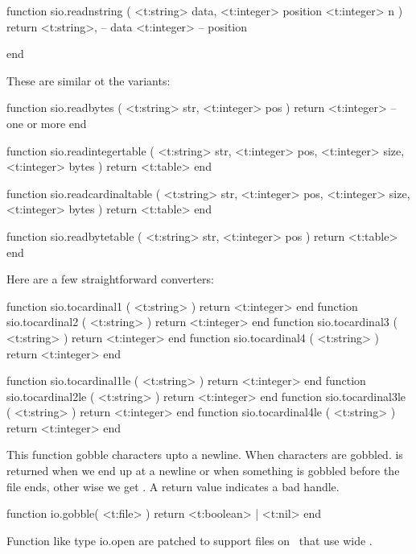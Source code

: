 function sio.readnstring (
    <t:string>  data,
    <t:integer> position
    <t:integer> n
)
    return
        <t:string>,  -- data
        <t:integer>  -- position

end
\stoptyping

These are similar ot the  variants:

\starttyping[option=LUA]
function sio.readbytes (
    <t:string>  str,
    <t:integer> pos
)
    return <t:integer> -- one or more
end

function sio.readintegertable (
    <t:string>  str,
    <t:integer> pos,
    <t:integer> size,
    <t:integer> bytes
)
    return <t:table>
end

function sio.readcardinaltable (
    <t:string>  str,
    <t:integer> pos,
    <t:integer> size,
    <t:integer> bytes
)
    return <t:table>
end

function sio.readbytetable (
    <t:string>  str,
    <t:integer> pos
)
    return <t:table>
end
\stoptyping

Here are a few straightforward converters:

\starttyping[option=LUA]
function sio.tocardinal1 ( <t:string> ) return <t:integer> end
function sio.tocardinal2 ( <t:string> ) return <t:integer> end
function sio.tocardinal3 ( <t:string> ) return <t:integer> end
function sio.tocardinal4 ( <t:string> ) return <t:integer> end

function sio.tocardinal1le ( <t:string> ) return <t:integer> end
function sio.tocardinal2le ( <t:string> ) return <t:integer> end
function sio.tocardinal3le ( <t:string> ) return <t:integer> end
function sio.tocardinal4le ( <t:string> ) return <t:integer> end
\stoptyping

\stopsubsection

\startsubsection[title=Extra file (IO) helpers]

This function gobble characters upto a newline. When characters are gobbled.
 is returned when we end up at a newline or when something is gobbled
before the file ends, other wise we get . A  return value
indicates a bad handle.

\starttyping[option=LUA]
function io.gobble( <t:file> )
    return <t:boolean> | <t:nil>
end
\stoptyping

Function like type {io.open}  are patched to support files on
\MSWINDOWS\ that use wide \UNICODE.

\stopsubsection

\startsubsection[title=Extra operating system (OS) helpers]

